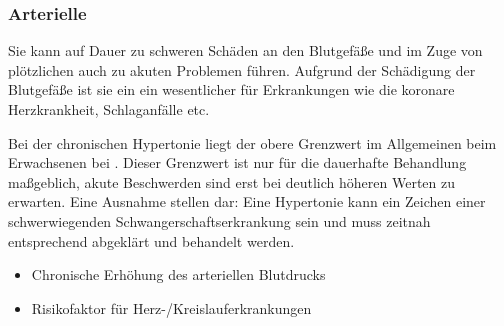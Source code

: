 

\subsubsection{Arterielle }
\label{topic:hypertonie}
\label{topic:arterielle-hypertonie}



\TextSlide{{\TxBeschreibung}}
{%
 Sie kann auf
Dauer zu schweren Schäden an den Blutgefäße und im Zuge 
von plötzlichen  auch zu akuten
Problemen führen. Aufgrund der Schädigung der Blutgefäße
ist sie ein ein wesentlicher  für
Erkrankungen wie die koronare Herzkrankheit, Schlaganfälle
etc. 

Bei der chronischen Hypertonie liegt der obere
Grenzwert im Allgemeinen 
beim Erwachsenen bei . Dieser Grenzwert
ist nur für die dauerhafte Behandlung maßgeblich, akute
Beschwerden sind erst bei deutlich höheren Werten zu
erwarten. Eine Ausnahme stellen  dar:
Eine Hypertonie kann ein Zeichen einer schwerwiegenden
Schwangerschaftserkrankung sein und muss zeitnah
entsprechend abgeklärt und behandelt werden.
}
{%
\begin{itemize}
  \item Chronische Erhöhung des arteriellen Blutdrucks
  \item Risikofaktor für Herz-/Kreis\-lauf\-er\-krank\-ung\-en
\end{itemize}
}


% 
% 

